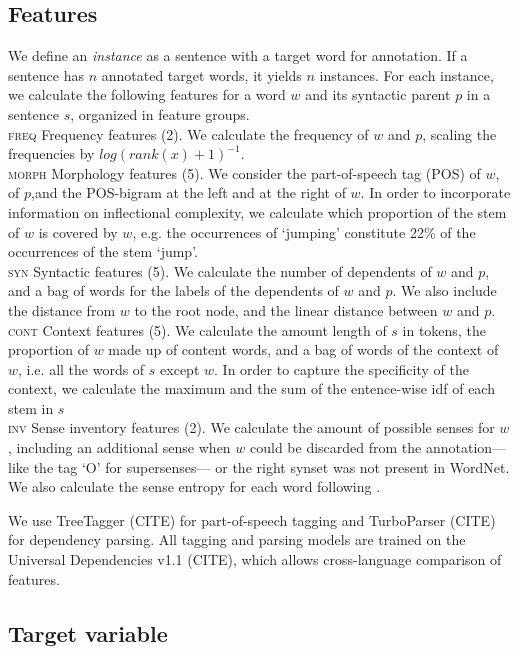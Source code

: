 \documentclass[11pt,a4paper]{article}
\begin{document}
\subsection{Features}
We define an \textit{instance} as a sentence with a target word for annotation. If a sentence has $n$ annotated target words, it yields $n$ instances. For each instance, we calculate the following features for a word $w$ and its syntactic parent $p$ in a sentence $s$, organized in feature groups.\\ 
\noindent\textsc{freq} Frequency features (2). We calculate the frequency of $w$ and $p$, scaling the frequencies by $log(rank(x)+1)^{-1}$.\\
\textsc{morph} Morphology features (5). We consider the part-of-speech tag (POS) of $w$, of $p$,and the POS-bigram at the left and at the right of $w$. In order to incorporate information on inflectional complexity, we calculate which proportion of the stem of $w$ is covered by $w$, e.g. the occurrences of `jumping' constitute 22\% of the occurrences of the stem `jump'. \\
\textsc{syn} Syntactic features (5). We calculate the number of dependents of $w$ and $p$, and a bag of words for the labels of the dependents of $w$ and $p$. We also include the distance from $w$ to the root node, and the linear distance between $w$ and $p$.\\
\textsc{cont} Context features (5). We calculate the amount length of $s$ in tokens, the proportion of $w$ made up of content words, and a bag of words of the context of $w$, i.e. all the words of $s$ except $w$. In order to capture the specificity of the context, we calculate the maximum and the sum of the entence-wise idf of each stem in $s$ \\
\textsc{inv} Sense inventory features (2). We calculate the amount of possible senses for $w$, including an additional sense when $w$ could be discarded from the annotation---like the tag `O' for supersenses--- or the right synset was not present in WordNet. We also calculate the sense entropy for each word following . 


We use TreeTagger (CITE) for part-of-speech tagging and TurboParser (CITE) for dependency parsing. All tagging and parsing models are trained on the Universal Dependencies v1.1 (CITE), which allows cross-language comparison of features.

\subsection{Target variable}
\end{document}
